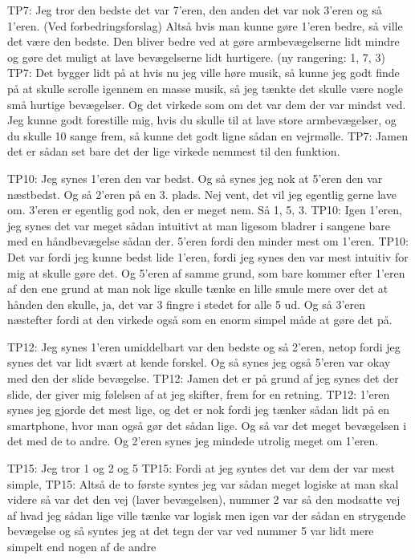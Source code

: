 TP7: Jeg tror den bedste det var 7’eren, den anden det var nok 3’eren og så 1’eren. (Ved forbedringsforslag) Altså hvis man kunne gøre 1’eren bedre, så ville det være den bedste. Den bliver bedre ved at gøre armbevægelserne lidt mindre og gøre det muligt at lave bevægelserne lidt hurtigere. (ny rangering: 1, 7, 3)
TP7: Det bygger lidt på at hvis nu jeg ville høre musik, så kunne jeg godt finde på at skulle scrolle igennem en masse musik, så jeg tænkte det skulle være nogle små hurtige bevægelser. Og det virkede som om det var dem der var mindst ved. Jeg kunne godt forestille mig, hvis du skulle til at lave store armbevægelser, og du skulle 10 sange frem, så kunne det godt ligne sådan en vejrmølle. 
TP7: Jamen det er sådan set bare det der lige virkede nemmest til den funktion. 


TP10: Jeg synes 1’eren den var bedst. Og så synes jeg nok at 5’eren den var næstbedst. Og så 2’eren på en 3. plads. Nej vent, det vil jeg egentlig gerne lave om. 3’eren er egentlig god nok, den er meget nem. Så 1, 5, 3.
TP10: Igen 1’eren, jeg synes det var meget sådan intuitivt at man ligesom bladrer i sangene bare med en håndbevægelse sådan der. 5’eren fordi den minder mest om 1’eren.
TP10: Det var fordi jeg kunne bedst lide 1’eren, fordi jeg synes den var mest intuitiv for mig at skulle gøre det. Og 5’eren af samme grund, som bare kommer efter 1’eren af den ene grund at man nok lige skulle tænke en lille smule mere over det at hånden den skulle, ja, det var 3 fingre i stedet for alle 5 ud. Og så 3’eren næstefter fordi at den virkede også som en enorm simpel måde at gøre det på. 

TP12: Jeg synes 1’eren umiddelbart var den bedste og så 2’eren, netop fordi jeg synes det var lidt svært at kende forskel. Og så synes jeg også 5’eren var okay med den der slide bevægelse. 
TP12: Jamen det er på grund af jeg synes det der slide, der giver mig følelsen af at jeg skifter, frem for en retning. 
TP12: 1’eren synes jeg gjorde det mest lige, og det er nok fordi jeg tænker sådan lidt på en smartphone, hvor man også gør det sådan lige. Og så var det meget bevægelsen i det med de to andre. Og 2’eren synes jeg mindede utrolig meget om 1’eren.

TP15: Jeg tror 1 og 2 og 5
TP15: Fordi at jeg syntes det var dem der var mest simple, 
TP15: Altså de to første syntes jeg var sådan meget logiske at man skal videre så var det den vej (laver bevægelsen), nummer 2 var så den modsatte vej af hvad jeg sådan lige ville tænke var logisk men igen var der sådan en strygende bevægelse og så syntes jeg at det tegn der var ved nummer 5 var lidt mere simpelt end nogen af de andre



